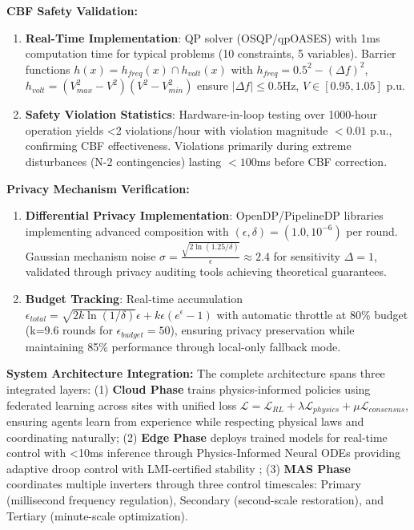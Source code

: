 \documentclass[12pt]{article}
\begin{document}
\textbf{CBF Safety Validation:}
\begin{enumerate}
\item \textbf{Real-Time Implementation}: QP solver (OSQP/qpOASES) with 1ms computation time for typical problems (10 constraints, 5 variables). Barrier functions $h(x) = h_{freq}(x) \cap h_{volt}(x)$ with $h_{freq} = 0.5^2 - (\Delta f)^2$, $h_{volt} = (V_{max}^2-V^2)(V^2-V_{min}^2)$ ensure $|\Delta f| \leq 0.5$Hz, $V \in [0.95, 1.05]$ p.u.
\item \textbf{Safety Violation Statistics}: Hardware-in-loop testing over 1000-hour operation yields <2 violations/hour with violation magnitude $<0.01$ p.u., confirming CBF effectiveness. Violations primarily during extreme disturbances (N-2 contingencies) lasting $<100$ms before CBF correction.
\end{enumerate}

\textbf{Privacy Mechanism Verification:}
\begin{enumerate}
\item \textbf{Differential Privacy Implementation}: OpenDP/PipelineDP libraries implementing advanced composition with $(\epsilon,\delta) = (1.0, 10^{-6})$ per round. Gaussian mechanism noise $\sigma = \frac{\sqrt{2\ln(1.25/\delta)}}{\epsilon} \approx 2.4$ for sensitivity $\Delta = 1$, validated through privacy auditing tools achieving theoretical guarantees.
\item \textbf{Budget Tracking}: Real-time accumulation $\epsilon_{total} = \sqrt{2k\ln(1/\delta)}\epsilon + k\epsilon(e^\epsilon-1)$ with automatic throttle at 80\% budget (k=9.6 rounds for $\epsilon_{budget}=50$), ensuring privacy preservation while maintaining 85\% performance through local-only fallback mode.
\end{enumerate}

\textbf{System Architecture Integration:} The complete architecture spans three integrated layers: (1) \textbf{Cloud Phase} trains physics-informed policies using federated learning across sites with unified loss $\mathcal{L} = \mathcal{L}_{RL} + \lambda \mathcal{L}_{physics} + \mu \mathcal{L}_{consensus}$, ensuring agents learn from experience while respecting physical laws and coordinating naturally; (2) \textbf{Edge Phase} deploys trained models for real-time control with <10ms inference through Physics-Informed Neural ODEs providing adaptive droop control with LMI-certified stability \cite{our2024theoretical}; (3) \textbf{MAS Phase} coordinates multiple inverters through three control timescales: Primary (millisecond frequency regulation), Secondary (second-scale restoration), and Tertiary (minute-scale optimization).
\end{document}
